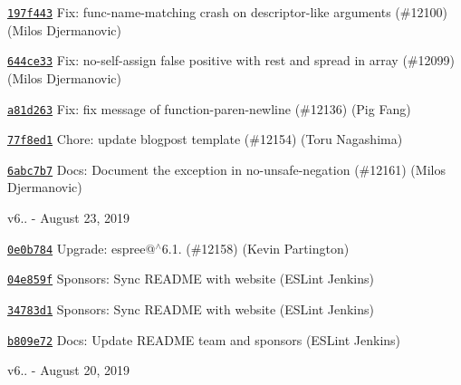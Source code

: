 \begin{DoxyItemize}
\item \href{https://github.com/eslint/eslint/commit/197f4432fca70a574028e5568c48afad12213224}{\texttt{ {\ttfamily 197f443}}} Fix\+: func-\/name-\/matching crash on descriptor-\/like arguments (\#12100) (Milos Djermanovic)
\item \href{https://github.com/eslint/eslint/commit/644ce3306748a33b74fc6a94be0267c2c9f19348}{\texttt{ {\ttfamily 644ce33}}} Fix\+: no-\/self-\/assign false positive with rest and spread in array (\#12099) (Milos Djermanovic)
\item \href{https://github.com/eslint/eslint/commit/a81d2636ce41fb34d6826c2e9857814e11cb9c30}{\texttt{ {\ttfamily a81d263}}} Fix\+: fix message of function-\/paren-\/newline (\#12136) (Pig Fang)
\item \href{https://github.com/eslint/eslint/commit/77f8ed1ad9656c526217ce54a6717fa232d522c8}{\texttt{ {\ttfamily 77f8ed1}}} Chore\+: update blogpost template (\#12154) (Toru Nagashima)
\item \href{https://github.com/eslint/eslint/commit/6abc7b72dfb824a372379708ca39340b2c7abc03}{\texttt{ {\ttfamily 6abc7b7}}} Docs\+: Document the exception in no-\/unsafe-\/negation (\#12161) (Milos Djermanovic)
\end{DoxyItemize}

v6.. -\/ August 23, 2019


\begin{DoxyItemize}
\item \href{https://github.com/eslint/eslint/commit/0e0b784b922051c2a1d39dd8160382114b645800}{\texttt{ {\ttfamily 0e0b784}}} Upgrade\+: espree@\texorpdfstring{$^\wedge$}{\string^}6.1. (\#12158) (Kevin Partington)
\item \href{https://github.com/eslint/eslint/commit/04e859f228d081efd3af6edb22563dbc775f8d1d}{\texttt{ {\ttfamily 04e859f}}} Sponsors\+: Sync README with website (ESLint Jenkins)
\item \href{https://github.com/eslint/eslint/commit/34783d10ff9b58a3c1e39a36e10864caeb9f66e0}{\texttt{ {\ttfamily 34783d1}}} Sponsors\+: Sync README with website (ESLint Jenkins)
\item \href{https://github.com/eslint/eslint/commit/b809e72221bc658e5a42bfd4b8723d3771571f9e}{\texttt{ {\ttfamily b809e72}}} Docs\+: Update README team and sponsors (ESLint Jenkins)
\end{DoxyItemize}

v6.. -\/ August 20, 2019


